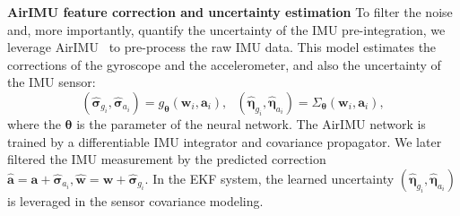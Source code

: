 \textbf{AirIMU feature correction and uncertainty estimation}
To filter the noise and, more importantly, quantify the uncertainty of the IMU pre-integration, we leverage AirIMU~\cite{qiu2023airimu} to pre-process the raw IMU data.
This model estimates the corrections of the gyroscope and the accelerometer, and also the uncertainty of the IMU sensor:
\begin{equation}
    \left(\hat{\boldsymbol{\sigma}}_{g_i}, \hat{\boldsymbol{\sigma}}_{a_i}\right) = g_{\boldsymbol{\theta}}\left(\mathbf{w}_i, \mathbf{a}_i\right), \ \ \  \left(\hat{\boldsymbol{\eta}}_{g_i}, \hat{\boldsymbol{\eta}}_{a_i}\right) = \Sigma_{\boldsymbol{\theta}}\left(\mathbf{w}_i, \mathbf{a}_i\right),
\end{equation}
where the $\mathbf{\theta}$ is the parameter of the neural network. The AirIMU network is trained by a differentiable IMU integrator and covariance propagator.
We later filtered the IMU measurement by the predicted correction $\hat{\mathbf{a}} = \mathbf{a} + \hat{\boldsymbol{\sigma}}_{a_i}, \hat{\mathbf{w}} = \mathbf{w} +  \hat{\boldsymbol{\sigma}}_{g_i}$. In the EKF system, the learned uncertainty $(\hat{\boldsymbol{\eta}}_{g_i}, \hat{\boldsymbol{\eta}}_{a_i})$ is leveraged in the sensor covariance modeling.

